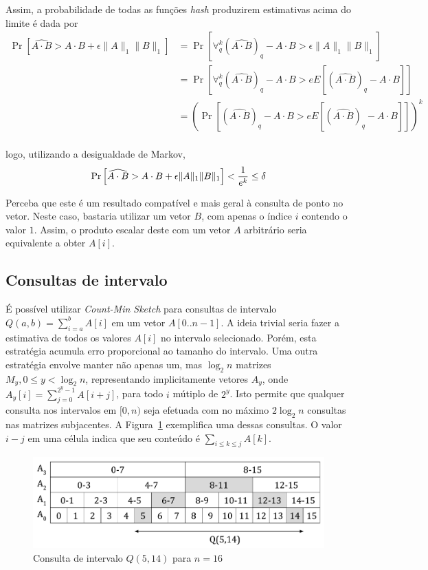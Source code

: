 Assim, a probabilidade de todas as funções \emph{hash} produzirem estimativas acima do limite é dada por
\begin{align*}
    \Pr\left[ \widehat{A \cdot B} > A \cdot B + \epsilon \lVert A \rVert_1 \lVert B \rVert_1 \right] 
    &= \Pr\left[ \forall_q^k (\widehat{A \cdot B})_q -  A \cdot B > \epsilon \lVert A \rVert_1 \lVert B \rVert_1 \right] \\
    &= \Pr\left[ \forall_q^k (\widehat{A \cdot B})_q -  A \cdot B > e  E\left[ (\widehat{A \cdot B})_q - A \cdot B \right]  \right] \\
    &= \left(\Pr\left[ (\widehat{A \cdot B})_q -  A \cdot B > e  E\left[ (\widehat{A \cdot B})_q - A \cdot B \right]  \right]\right)^k \\
\end{align*}

logo, utilizando a desigualdade de Markov,
\[
    \Pr\left[ \widehat{A \cdot B} > A \cdot B + \epsilon \lVert A \rVert_1 \lVert B \rVert_1 \right] < \frac{1}{e^k} \leq \delta \\
\]

Perceba que este é um resultado compatível e mais geral à consulta de ponto no vetor. Neste caso, bastaria utilizar um vetor $B$, com apenas o índice $i$ contendo o valor $1$. Assim, o produto escalar deste com um vetor $A$ arbitrário seria equivalente a obter $A[i]$.

\subsection{Consultas de intervalo}

É possível utilizar \emph{Count-Min Sketch} para consultas de intervalo $Q(a, b) = \sum_{i=a}^b A[i]$ em um vetor $A[0..n-1]$. A ideia trivial seria fazer a estimativa de todos os valores $A[i]$ no intervalo selecionado. Porém, esta estratégia acumula erro proporcional ao tamanho do intervalo. Uma outra estratégia envolve manter não apenas um, mas $\log_2 n$ matrizes $M_y, 0 \leq y < \log_2 n$, representando implicitamente vetores $A_y$, onde $A_y[i] = \sum_{j=0}^{2^y-1} A[i+j]$, para todo $i$ mútiplo de $2^y$. Isto permite que qualquer consulta nos intervalos em $[0, n)$ seja efetuada com no máximo $2 \log_2 n$ consultas nas matrizes subjacentes. A Figura~\ref{fig:countmin2} exemplifica uma dessas consultas. O valor $i-j$ em uma célula indica que seu conteúdo é $\sum_{i \leq k \leq j} A[k]$.

\begin{figure}[!htbp]
  \centering
  \includegraphics[scale=0.45]{figures/countmin2.pdf}
  \caption{Consulta de intervalo $Q(5, 14)$ para $n=16$}
  \label{fig:countmin2}
\end{figure}

